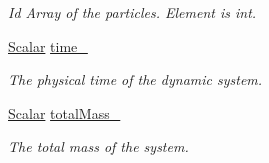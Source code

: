 \begin{DoxyCompactItemize}
\begin{DoxyCompactList}\small\item\em Id Array of the particles. Element is int. \end{DoxyCompactList}\item 
\mbox{\hyperlink{class_vel_indep_particles_a5d275b22f0d759f360ddd80e78f4b466}{Scalar}} \mbox{\hyperlink{class_vel_indep_particles_a8140d67141a80312c882b8fd5368e75a}{time\+\_\+}}
\begin{DoxyCompactList}\small\item\em The physical time of the dynamic system. \end{DoxyCompactList}\item 
\mbox{\hyperlink{class_vel_indep_particles_a5d275b22f0d759f360ddd80e78f4b466}{Scalar}} \mbox{\hyperlink{class_vel_indep_particles_ac1bc885b0b3434f604776880cb551a17}{total\+Mass\+\_\+}}
\begin{DoxyCompactList}\small\item\em The total mass of the system. \end{DoxyCompactList}\end{DoxyCompactItemize}
